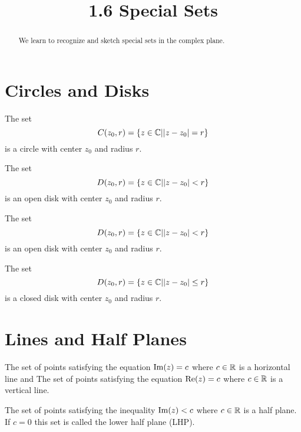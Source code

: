 \documentclass[handout]{ximera}
\title{1.6 Special Sets}
\begin{document}
\begin{abstract}
We learn to recognize and sketch special sets in the complex plane.
\end{abstract}

\maketitle

\section{Circles and Disks}

\begin{example}[example 1]
The set 
\[
C(z_0,r) = \{z\in \mathbb C | |z-z_0| =r \}
\]
is a circle with center $z_0$ and radius $r$.
\end{example}


\begin{example}[example 2]
The set 
\[
D(z_0,r) = \{z\in \mathbb C | |z-z_0| <r \}
\]
is an open disk with center $z_0$ and radius $r$.
\end{example}


\begin{example}[example 2]
The set 
\[
D(z_0,r) = \{z\in \mathbb C | |z-z_0| <r \}
\]
is an open disk with center $z_0$ and radius $r$.
\end{example}


\begin{example}[example 3]
The set 
\[
D(z_0,r) = \{z\in \mathbb C | |z-z_0| \leq r \}
\]
is a closed disk with center $z_0$ and radius $r$.
\end{example}


\section{Lines and Half Planes}

\begin{example}[example 4]
The set of points satisfying the equation $\operatorname{Im}(z) = c$ where $c \in \mathbb R$ is a horizontal line and
The set of points satisfying the equation $\operatorname{Re}(z) = c$ where $c \in \mathbb R$ is a vertical line.

\end{example}


\begin{example}[example 5]
The set of points satisfying the inequality $\operatorname{Im}(z) < c$ where $c \in \mathbb R$ is a
half plane. If $c=0$ this set is called the lower half plane (LHP).
\end{example}
\end{document}

